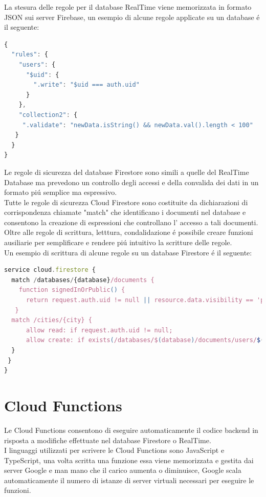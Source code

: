 La stesura delle regole per il database RealTime viene memorizzata in formato JSON sui server Firebase, un esempio di alcune regole applicate su un database \'e il seguente:


\begin{lstlisting}[language=javascript,caption={Firebase Rules esempio }]
{
  "rules": {
    "users": {
      "$uid": {
        ".write": "$uid === auth.uid"
      }
    },
    "collection2": {
     ".validate": "newData.isString() && newData.val().length < 100"
   }
  }
}
\end{lstlisting}


Le regole di sicurezza del database Firestore sono simili a quelle del RealTime Database ma prevedono un controllo degli accessi e della convalida dei dati in un formato pi\'u semplice ma espressivo.\\
Tutte le regole di sicurezza Cloud Firestore sono costituite da dichiarazioni di corrispondenza chiamate "match" che identificano i documenti nel database e consentono la creazione di espressioni che controllano l' accesso a tali documenti.\\
Oltre alle regole di scrittura, letttura, condalidazione \'e possibile creare funzioni ausiliarie per semplificare e rendere pi\'u intuitivo la scritture delle regole.\\
Un esempio di scrittura di alcune regole su un database Firestore \'e il seguente:

\begin{lstlisting}[language=javascript,caption={Firestore Rules}]
service cloud.firestore {
  match /databases/{database}/documents {
    function signedInOrPublic() {
      return request.auth.uid != null || resource.data.visibility == 'public';
   }
  match /cities/{city} {
      allow read: if request.auth.uid != null;
      allow create: if exists(/databases/$(database)/documents/users/$(request.auth.uid))
  }
 }
}
\end{lstlisting}



\section{Cloud Functions}                 %

Le Cloud Functions consentono di eseguire automaticamente il codice backend in risposta a modifiche effettuate nel database Firestore o RealTime.\\
I linguaggi utilizzati per scrivere le Cloud Functions sono JavaScript e TypeScript, una volta scritta una funzione essa viene memorizzata e gestita dai server Google e man mano che il carico aumenta o diminuisce, Google scala automaticamente il numero di istanze di server virtuali necessari per eseguire le funzioni.


